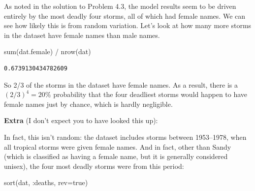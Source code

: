 \documentclass[
  letterpaper,
  DIV=11,
  numbers=noendperiod]{scrartcl}
\newenvironment{Shaded}{\begin{snugshade}}{\end{snugshade}}
\newcommand{\ConstantTok}[1]{\textcolor[rgb]{0.56,0.35,0.01}{#1}}
\newcommand{\FunctionTok}[1]{\textcolor[rgb]{0.28,0.35,0.67}{#1}}
\newcommand{\NormalTok}[1]{\textcolor[rgb]{0.00,0.23,0.31}{#1}}
\newcommand{\OperatorTok}[1]{\textcolor[rgb]{0.37,0.37,0.37}{#1}}
\begin{document}
As noted in the solution to Problem 4.3, the model results seem to be
driven entirely by the most deadly four storms, all of which had female
names. We can see how likely this is from random variation. Let's look
at how many more storms in the dataset have female names than male
names.

\begin{Shaded}
\begin{Highlighting}[]
\FunctionTok{sum}\NormalTok{(dat.female) }\OperatorTok{/} \FunctionTok{nrow}\NormalTok{(dat)}
\end{Highlighting}
\end{Shaded}

\begin{verbatim}
0.6739130434782609
\end{verbatim}

So 2/3 of the storms in the dataset have female names. As a result,
there is a \((2/3)^4 =20\%\) probability that the four deadliest storms
would happen to have female names just by chance, which is hardly
negligible.

\textbf{Extra} (I don't expect you to have looked this up):

In fact, this isn't random: the dataset includes storms between
1953--1978, when all tropical storms were given female names. And in
fact, other than Sandy (which is classified as having a female name, but
it is generally considered unisex), the four most deadly storms were
from this period:

\begin{Shaded}
\begin{Highlighting}[]
\FunctionTok{sort}\NormalTok{(dat, }\OperatorTok{:}\NormalTok{deaths, rev}\OperatorTok{=}\ConstantTok{true}\NormalTok{)}
\end{Highlighting}
\end{Shaded}
\end{document}
